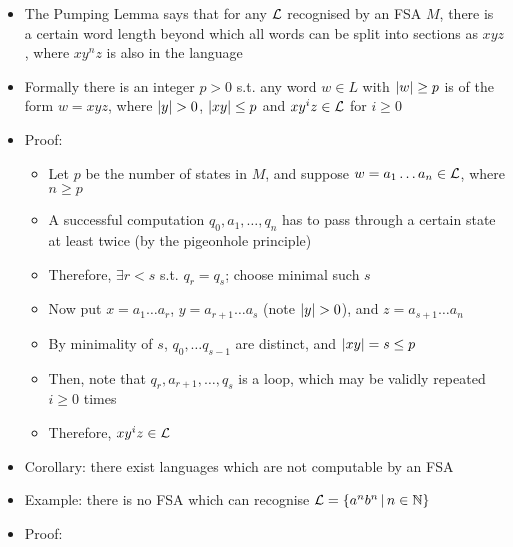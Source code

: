 \begin{itemize}
	
	\item The Pumping Lemma says that for any $ \mathcal{L} $ recognised by an FSA $ M $, there is a certain word length beyond which all words can be split into sections as $ xyz$, where $ x y^n z $ is also in the language
	
	\item Formally there is an integer $ p > 0 $ s.t. any word $ w \in L $ with $ \abs{w} \ge p $ is of the form $ w = xyz $, where $ \abs{y} > 0 $, $ \abs{xy} \le p $ and $ x y^i z \in \mathcal{L} $ for $ i \ge 0 $
	
	\item Proof:
	
	\begin{itemize}
		
		\item Let $ p $ be the number of states in $ M $, and suppose $ w = a_1 \dots a_n \in \mathcal{L} $, where $ n \ge p $
		
		\item A successful computation $ q_0, a_1, \dots, q_n $ has to pass through a certain state at least twice (by the pigeonhole principle)
		
		\item Therefore, $ \exists r < s $ s.t. $ q_r = q_s $; choose minimal such $ s $
		
		\item Now put $ x = a_1 \dots a_r $, $ y = a_{r+1} \dots a_s $ (note $ \abs{y} > 0$), and $ z = a_{s+1} \dots a_n $
		
		\item By minimality of $ s $, $ q_0, \dots q_{s-1} $ are distinct, and $ \abs{xy} = s \le p $
		
		\item Then, note that $ q_r, a_{r+1}, \dots, q_{s} $ is a loop, which may be validly repeated $ i \ge 0 $ times
		
		\item Therefore, $ x y^i z \in \mathcal{L} $
		
	\end{itemize}

	\item Corollary: there exist languages which are not computable by an FSA
	
	\item Example: there is no FSA which can recognise $ \mathcal{L} = \left\lbrace a^n b^n \, | \, n \in \mathbb{N} \right\rbrace $
	
	\item Proof:
	

\end{itemize}
